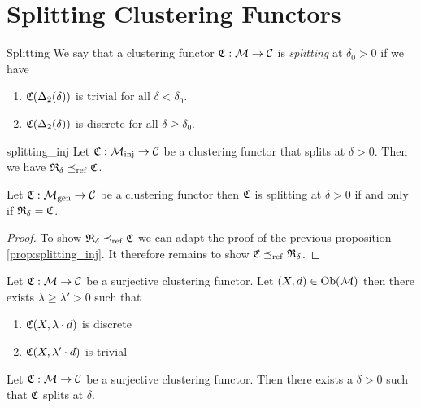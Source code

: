 \section{Splitting Clustering Functors}

\begin{definition}{Splitting}{}
We say that a clustering functor $\mathfrak{C}: \mathcal{M} \to \mathcal{C}$ is \emph{splitting} at $\delta_0 > 0$ if we have

\begin{enumerate}
    \item $\mathfrak{C}(\Delta_2(\delta))$ is trivial for all $\delta < \delta_0$.
    \item $\mathfrak{C}(\Delta_2(\delta))$ is discrete for all $\delta \geq \delta_0$.
\end{enumerate}

\end{definition}

\begin{proposition}{}{splitting_inj}
Let $\mathfrak{C}: {\mathcal{M}_\mathrm{inj}} \to \mathcal{C}$ be a clustering functor that splits at $\delta > 0$. Then we have $\mathfrak{R}_\delta \preceq_\mathrm{ref} \mathfrak{C}$.
\end{proposition}

\begin{proposition}{}{}
Let $\mathfrak{C}: {\mathcal{M}_\mathrm{gen}} \to \mathcal{C}$ be a clustering functor then $\mathfrak{C}$ is splitting at $\delta > 0$ if and only if $\mathfrak{R}_\delta = \mathfrak{C}$.
\end{proposition}

\begin{proof}
To show $\mathfrak{R}_\delta \preceq_\mathrm{ref} \mathfrak{C}$ we can adapt the proof of the previous proposition \ref{prop:splitting_inj}. It therefore remains to show $\mathfrak{C} \preceq_\mathrm{ref} \mathfrak{R}_\delta$. \todo
\end{proof}

\begin{lemma}{}{}
\newresult
Let $\mathfrak{C}: \mathcal{M} \to \mathcal{C}$ be a surjective clustering functor. Let $(X,d) \in \mathrm {Ob}(\mathcal{M})$ then there exists $\lambda \geq \lambda' > 0$ such that
\begin{enumerate}
    \item $\mathfrak{C}(X, \lambda \cdot d)$ is discrete
    \item $\mathfrak{C}(X, \lambda' \cdot d)$ is trivial
\end{enumerate}
\end{lemma}

\begin{corollary}{}{}
\newresult

Let $\mathfrak{C}: \mathcal{M} \to \mathcal{C}$ be a surjective clustering functor. Then there exists a $\delta > 0$ such that $\mathfrak{C}$ splits at $\delta$.
\end{corollary}

